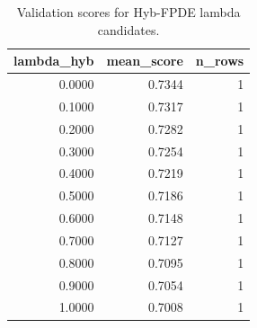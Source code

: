 \begin{table}[t]
\caption{Validation scores for Hyb-FPDE lambda candidates.}
\label{tab:lambda_distribution_computed}
\centering
\begin{tabular}{rrr}
\toprule
lambda\_hyb & mean\_score & n\_rows \\
\midrule
0.0000 & 0.7344 & 1 \\
0.1000 & 0.7317 & 1 \\
0.2000 & 0.7282 & 1 \\
0.3000 & 0.7254 & 1 \\
0.4000 & 0.7219 & 1 \\
0.5000 & 0.7186 & 1 \\
0.6000 & 0.7148 & 1 \\
0.7000 & 0.7127 & 1 \\
0.8000 & 0.7095 & 1 \\
0.9000 & 0.7054 & 1 \\
1.0000 & 0.7008 & 1 \\
\bottomrule
\end{tabular}

\end{table}
